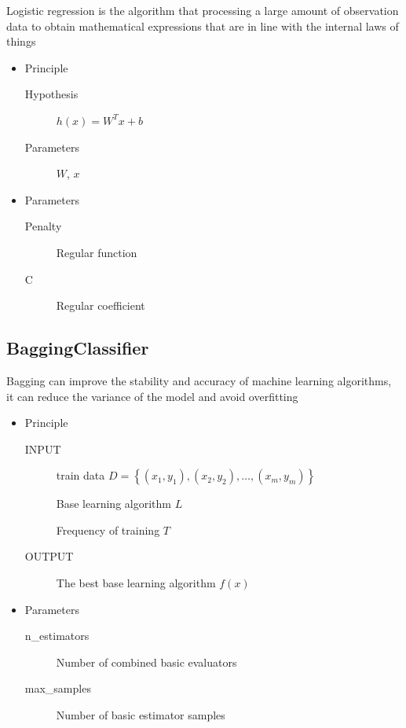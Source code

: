 Logistic regression is the algorithm that 
processing a large amount of 
observation data to 
obtain mathematical expressions 
that are in line with 
the internal laws of things

\begin{itemize}
	\item Principle
	
	\begin{description}
		\item[Hypothesis] $h(x)=W^{T} x+b$
		\item[Parameters] $ W$, $x$
	\end{description}
	
	\item Parameters
	
	\begin{description}
		\item[Penalty] Regular function
		\item[C] Regular coefficient
	\end{description}
	
\end{itemize}

\subsection{BaggingClassifier}


Bagging can improve the stability and accuracy 
of machine learning algorithms, 
it can reduce the variance of 
the model and avoid overfitting

\begin{itemize}
	\item Principle
	
	\begin{description}
		\item[INPUT] train data $ D = \left\{ 
		\left(x_1,y_1 \right), \left(x_2,y_2 \right),
		\dots,\left(x_m,y_m \right) \right\}$
		
		Base learning algorithm $L$
	
		Frequency of training $T$
		\item[OUTPUT] The best base learning algorithm $f(x)$
	
	\end{description}
	
	\item Parameters
	
	\begin{description}
		\item[n_estimators] Number of combined basic evaluators
		\item[max_samples] Number of basic estimator samples
	\end{description}
	
\end{itemize}

